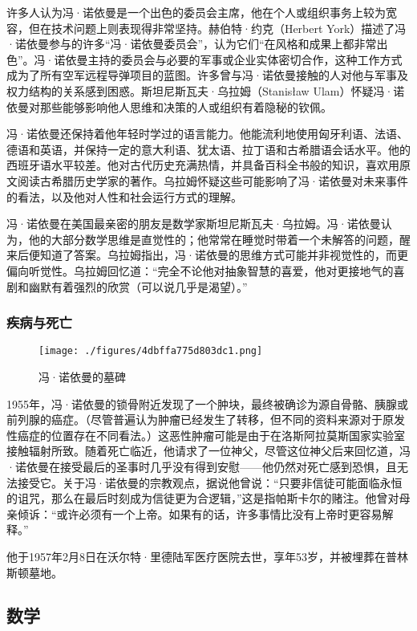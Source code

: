 许多人认为冯·诺依曼是一个出色的委员会主席，他在个人或组织事务上较为宽容，但在技术问题上则表现得非常坚持。赫伯特·约克（Herbert York）描述了冯·诺依曼参与的许多“冯·诺依曼委员会”，认为它们“在风格和成果上都非常出色”。冯·诺依曼主持的委员会与必要的军事或企业实体密切合作，这种工作方式成为了所有空军远程导弹项目的蓝图。许多曾与冯·诺依曼接触的人对他与军事及权力结构的关系感到困惑。斯坦尼斯瓦夫·乌拉姆（Stanisław Ulam）怀疑冯·诺依曼对那些能够影响他人思维和决策的人或组织有着隐秘的钦佩。

冯·诺依曼还保持着他年轻时学过的语言能力。他能流利地使用匈牙利语、法语、德语和英语，并保持一定的意大利语、犹太语、拉丁语和古希腊语会话水平。他的西班牙语水平较差。他对古代历史充满热情，并具备百科全书般的知识，喜欢用原文阅读古希腊历史学家的著作。乌拉姆怀疑这些可能影响了冯·诺依曼对未来事件的看法，以及他对人性和社会运行方式的理解。

冯·诺依曼在美国最亲密的朋友是数学家斯坦尼斯瓦夫·乌拉姆。冯·诺依曼认为，他的大部分数学思维是直觉性的；他常常在睡觉时带着一个未解答的问题，醒来后便知道了答案。乌拉姆指出，冯·诺依曼的思维方式可能并非视觉性的，而更偏向听觉性。乌拉姆回忆道：“完全不论他对抽象智慧的喜爱，他对更接地气的喜剧和幽默有着强烈的欣赏（可以说几乎是渴望）。”
\subsubsection{疾病与死亡}
\begin{figure}[ht]
\centering
\texttt{[image: ./figures/4dbffa775d803dc1.png]}
\caption{冯·诺依曼的墓碑} \label{fig_Neuman_3}
\end{figure}
1955年，冯·诺依曼的锁骨附近发现了一个肿块，最终被确诊为源自骨骼、胰腺或前列腺的癌症。（尽管普遍认为肿瘤已经发生了转移，但不同的资料来源对于原发性癌症的位置存在不同看法。）这恶性肿瘤可能是由于在洛斯阿拉莫斯国家实验室接触辐射所致。随着死亡临近，他请求了一位神父，尽管这位神父后来回忆道，冯·诺依曼在接受最后的圣事时几乎没有得到安慰——他仍然对死亡感到恐惧，且无法接受它。关于冯·诺依曼的宗教观点，据说他曾说：“只要非信徒可能面临永恒的诅咒，那么在最后时刻成为信徒更为合逻辑，”这是指帕斯卡尔的赌注。他曾对母亲倾诉：“或许必须有一个上帝。如果有的话，许多事情比没有上帝时更容易解释。”

他于1957年2月8日在沃尔特·里德陆军医疗医院去世，享年53岁，并被埋葬在普林斯顿墓地。
\subsection{数学}  
